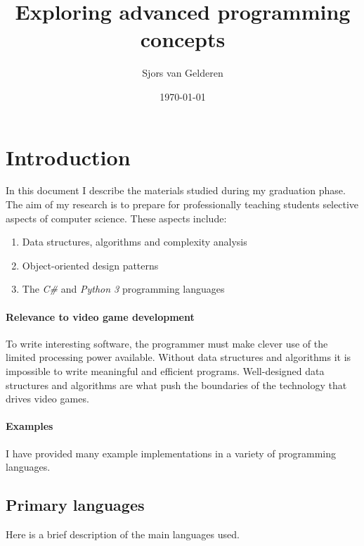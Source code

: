 \documentclass{article}
\author{Sjors van Gelderen}
\title{Exploring advanced programming concepts}
\date{\today{}}
\begin{document}
\maketitle{}


\newpage


\tableofcontents{}


\newpage


\section{Introduction}
In this document I describe the materials studied during my graduation phase. The aim of my research is to prepare
for professionally teaching students selective aspects of computer science. These aspects include:
\begin{enumerate}
\item{Data structures, algorithms and complexity analysis}
\item{Object-oriented design patterns}
\item{The {\em C\#} and {\em Python 3} programming languages}
\end{enumerate}

\paragraph{Relevance to video game development}
To write interesting software, the programmer must make clever use of the limited processing power available. Without data
structures and algorithms it is impossible to write meaningful and efficient programs. Well-designed data structures and
algorithms are what push the boundaries of the technology that drives video games.

\paragraph{Examples}
I have provided many example implementations in a variety of programming languages\cite{repo}.


\newpage


\subsection{Primary languages}
Here is a brief description of the main languages used.
\end{document}

